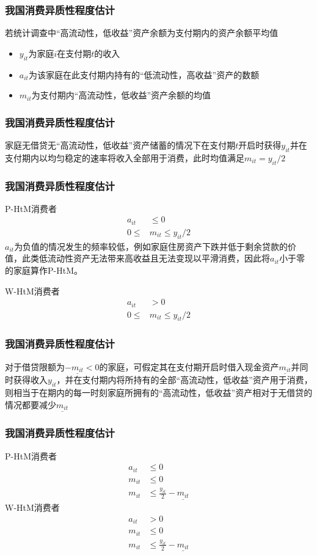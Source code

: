 \documentclass{beamer}
\begin{document}
\begin{frame}
\frametitle{我国消费异质性程度估计}
若统计调查中“高流动性，低收益”资产余额为支付期内的资产余额平均值
\begin{itemize}
\item $y_{it}$为家庭$i$在支付期$t$的收入
\item $a_{it}$为该家庭在此支付期内持有的“低流动性，高收益”资产的数额
\item $m_{it}$为支付期内“高流动性，低收益”资产余额的均值
\end{itemize}
\end{frame}

\begin{frame}
\frametitle{我国消费异质性程度估计}
家庭无借贷无“高流动性，低收益”资产储蓄的情况下在支付期$t$开启时获得$y_{it}$并在支付期内以均匀稳定的速率将收入全部用于消费，此时均值满足$m_{it}=y_{it}/2$
\end{frame}

\begin{frame}
\frametitle{我国消费异质性程度估计}
P-HtM消费者
\begin{align*}
a_{it} & \leq 0\\
0 \leq & m_{it} \leq y_{it}/2
\end{align*}
$a_{it}$为负值的情况发生的频率较低，例如家庭住房资产下跌并低于剩余贷款的价值，此类低流动性资产无法带来高收益且无法变现以平滑消费，因此将$a_{it}$小于零的家庭算作P-HtM。

\vspace{12 pt}
W-HtM消费者
\begin{align*}
a_{it} & > 0\\
0 \leq & m_{it} \leq y_{it}/2
\end{align*}
\end{frame}

\begin{frame}
\frametitle{我国消费异质性程度估计}
对于借贷限额为$-\underline{m_{it}}<0$的家庭，可假定其在支付期开启时借入现金资产$\underline{m_{it}}$并同时获得收入$y_{it}$，并在支付期内将所持有的全部“高流动性，低收益”资产用于消费，则相当于在期内的每一时刻家庭所拥有的“高流动性，低收益”资产相对于无借贷的情况都要减少$\underline{m_{it}}$
\end{frame}

\begin{frame}
\frametitle{我国消费异质性程度估计}
P-HtM消费者
\begin{align*}
a_{it} & \leq 0\\
m_{it} & \leq 0\\
m_{it} & \leq \frac{y_{it}}{2} - \underline{m_{it}}
\end{align*}
W-HtM消费者
\begin{align*}
a_{it} & > 0\\
m_{it} & \leq 0\\
m_{it} & \leq \frac{y_{it}}{2} - \underline{m_{it}}  
\end{align*}
\end{frame}
\end{document}
